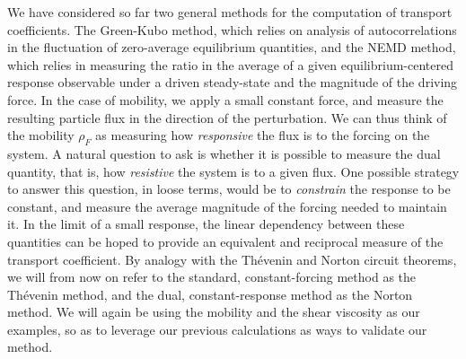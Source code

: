 We have considered so far two general methods for the computation of transport coefficients. The Green-Kubo method, which relies on analysis of autocorrelations in the fluctuation of zero-average equilibrium quantities, 
and the NEMD method, which relies in measuring the ratio in the average of a given equilibrium-centered response observable under a driven steady-state and the magnitude of the driving force.
In the case of mobility, we apply a small constant force, and measure the resulting particle flux in the direction of the perturbation. We can thus think of the mobility $\rho_F$ as measuring how \textit{responsive} the flux is to the forcing on the system.
A natural question to ask is whether it is possible to measure the dual quantity, that is, how \textit{resistive} the system is to a given flux. One possible strategy to answer this question, in loose terms, would be to \textit{constrain} the response to be constant, and measure the average magnitude of the forcing needed to maintain it.
In the limit of a small response, the linear dependency between these quantities can be hoped to provide an equivalent and reciprocal measure of the transport coefficient. By analogy with the Thévenin and Norton circuit theorems, we will from now on refer to the standard, constant-forcing method as the Thévenin method,
and the dual, constant-response method as the Norton method. We will again be using the mobility and the shear viscosity as our examples, so as to leverage our previous calculations as ways to validate our method.


